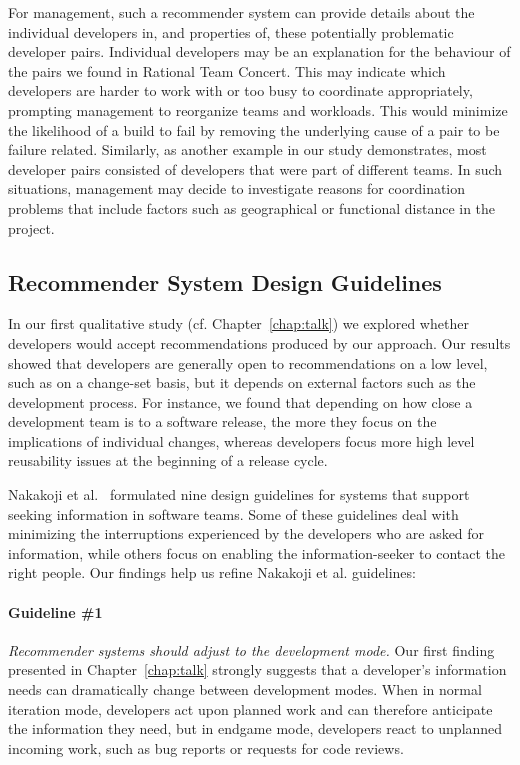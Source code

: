 For management, such a recommender system can provide details about the
individual developers in, and properties of, these potentially problematic
developer pairs. Individual developers may be an explanation for the behaviour of
the pairs we found in Rational Team Concert. This may indicate which developers are harder to work with or too busy to coordinate appropriately, prompting management
to reorganize teams and workloads. This would minimize the likelihood of a build
to fail by removing the underlying cause of a pair to be failure related.
Similarly, as another example in our study demonstrates, most developer pairs
consisted of developers that were part of different teams. In such
situations, management may decide to investigate reasons for coordination
problems that include factors such as geographical or functional distance in the project.

\subsection{Recommender System Design Guidelines}
\label{sec:sub:tools}
In our first qualitative study (cf. Chapter~\ref{chap:talk}) we explored whether developers would accept recommendations produced by our approach.
Our results showed that developers are generally open to recommendations on a low level, such as on a change-set basis, but it depends on external factors such as the development process.
For instance, we found that depending on how close a development team is to a software release, the more they focus on the implications of individual changes, whereas developers focus more high level reusability issues at the beginning of a release cycle.

Nakakoji et al.~\cite{nakakoji2010:rdc} formulated nine design guidelines for systems that support seeking information in software teams. Some of these guidelines deal with minimizing the interruptions experienced by the developers who are asked for information, while others focus on enabling the information-seeker to contact the right people. Our findings help us refine Nakakoji et al. guidelines:

\paragraph{Guideline \#1} \emph{Recommender systems should adjust to the development mode.}
Our first finding presented in Chapter~\ref{chap:talk} strongly suggests that a developer's information needs can dramatically change between development modes. 
%
When in normal iteration mode, developers act upon planned work and can therefore anticipate the information they need, but in endgame mode, developers react to unplanned incoming work, such as bug reports or requests for code reviews. 

